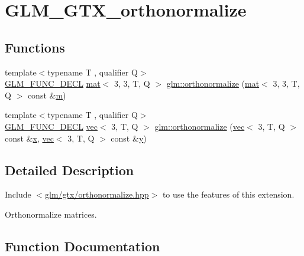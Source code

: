 \hypertarget{group__gtx__orthonormalize}{}\section{G\+L\+M\+\_\+\+G\+T\+X\+\_\+orthonormalize}
\label{group__gtx__orthonormalize}
\subsection*{Functions}
\begin{DoxyCompactItemize}
\item 
{\footnotesize template$<$typename T , qualifier Q$>$ }\\\mbox{\hyperlink{setup_8hpp_ab2d052de21a70539923e9bcbf6e83a51}{G\+L\+M\+\_\+\+F\+U\+N\+C\+\_\+\+D\+E\+CL}} \mbox{\hyperlink{structglm_1_1mat}{mat}}$<$ 3, 3, T, Q $>$ \mbox{\hyperlink{group__gtx__orthonormalize_ga4cab5d698e6e2eccea30c8e81c74371f}{glm\+::orthonormalize}} (\mbox{\hyperlink{structglm_1_1mat}{mat}}$<$ 3, 3, T, Q $>$ const \&\mbox{\hyperlink{_s_d_l__opengl__glext_8h_af593500c283bf1a787a6f947f503a5c2}{m}})
\item 
{\footnotesize template$<$typename T , qualifier Q$>$ }\\\mbox{\hyperlink{setup_8hpp_ab2d052de21a70539923e9bcbf6e83a51}{G\+L\+M\+\_\+\+F\+U\+N\+C\+\_\+\+D\+E\+CL}} \mbox{\hyperlink{structglm_1_1vec}{vec}}$<$ 3, T, Q $>$ \mbox{\hyperlink{group__gtx__orthonormalize_gac3bc7ef498815026bc3d361ae0b7138e}{glm\+::orthonormalize}} (\mbox{\hyperlink{structglm_1_1vec}{vec}}$<$ 3, T, Q $>$ const \&\mbox{\hyperlink{_s_d_l__opengl_8h_ad0e63d0edcdbd3d79554076bf309fd47}{x}}, \mbox{\hyperlink{structglm_1_1vec}{vec}}$<$ 3, T, Q $>$ const \&\mbox{\hyperlink{_s_d_l__opengl_8h_a1675d9d7bb68e1657ff028643b4037e3}{y}})
\end{DoxyCompactItemize}


\subsection{Detailed Description}
Include $<$\mbox{\hyperlink{orthonormalize_8hpp}{glm/gtx/orthonormalize.\+hpp}}$>$ to use the features of this extension.

Orthonormalize matrices. 

\subsection{Function Documentation}
\mbox{\label{group__gtx__orthonormalize_ga4cab5d698e6e2eccea30c8e81c74371f}} 
